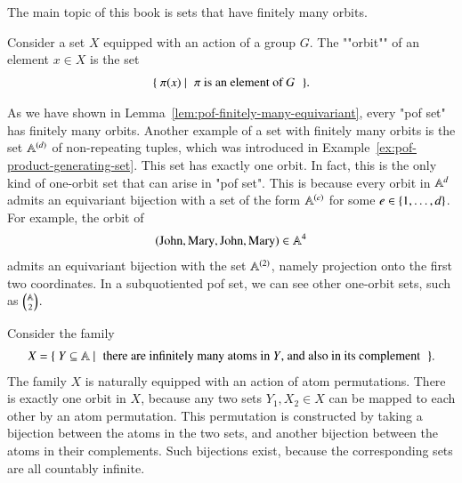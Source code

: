 The main topic of this book is sets that have finitely many orbits.

\begin{definition}[Orbit]\label{def:orbit}
    Consider a set $X$ equipped with an action of a group $G$. The  ""orbit"" of an element $x \in X$ is the set 
    \begin{align*}
        \setbuild{ \pi(x)}{$\pi$ is an element of $G$}.
    \end{align*}
\end{definition}

\begin{myexample}
    \label{ex:finite-constructions-of-of-sets}
     As we have shown in Lemma~\ref{lem:pof-finitely-many-equivariant}, every "pof set" has finitely many orbits. Another example of a set with finitely many orbits is the set $\mathbb A^{(d)}$ of non-repeating tuples, which was introduced in Example~\ref{ex:pof-product-generating-set}. This set has exactly one orbit. In fact, this is the only kind of one-orbit set that can arise in "pof set". This is because  every orbit in $\mathbb A^d$ admits an equivariant bijection with a set of the form $\mathbb A^{(e)}$ for some $e \in \{1,\ldots,d\}$. For example, the orbit of 
    \begin{align*}
    (\text{John},\text{Mary},\text{John},\text{Mary}) \in \mathbb A^4
    \end{align*}
admits an equivariant bijection with the set $\mathbb A^{(2)}$, namely projection onto the first two coordinates. In a subquotiented pof set, we can see other one-orbit sets, such as $\mathbb A \choose 2$. 
\end{myexample}

\begin{myexample}
\label{ex:infinite-co-infinite}
    Consider the family 
    \begin{align*}
    X = \setbuild { Y \subseteq \atoms}{there are infinitely many atoms in $Y$, and also in its complement}.
    \end{align*}
    The family $X$ is naturally equipped with an action of atom permutations. There is exactly one orbit in $X$, because any two sets $Y_1,X_2 \in X$ can be mapped to each other  by an atom permutation. This permutation is constructed by taking a bijection between the atoms in the two sets, and another bijection between the atoms in their complements. Such bijections exist, because the corresponding sets are all countably infinite.
\end{myexample}



